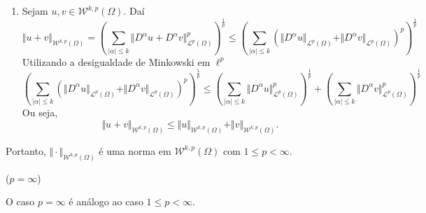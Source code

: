 \documentclass[a4paper, 11pt]{book}
\theoremstyle{definition}
\newcommand{\cL}{\mathcal{L}}
\newcommand{\cW}{\mathcal{W}}
\begin{document}
\begin{prf}
\begin{enumerate}[leftmargin=*]
        \item Sejam $u, v \in \cW^{k,p}(\Omega)$. Daí
        \[
            \Vert u + v \Vert_{\cW^{k,p}(\Omega)} = \left(\sum_{|\alpha| \leqslant k} \Vert D^\alpha u + D^\alpha v \Vert_{\cL^p(\Omega)}^p\right)^{\!\!\frac{1}{p}} \leqslant \left(\sum_{|\alpha| \leqslant k} \left(\Vert D^\alpha u \Vert_{\cL^p(\Omega)} + \Vert D^\alpha v \Vert_{\cL^p(\Omega)}\right)^p \right)^{\!\!\frac{1}{p}}
        \]
        Utilizando a desigualdade de Minkowski em $\ell^p$
        \[
            \left(\sum_{|\alpha| \leqslant k} \left(\Vert D^\alpha u \Vert_{\cL^p(\Omega)} + \Vert D^\alpha v \Vert_{\cL^p(\Omega)}\right)^p \right)^{\!\!\frac{1}{p}} \leqslant \left( \sum_{|\alpha| \leqslant k} \Vert D^\alpha u \Vert_{\cL^p(\Omega)}^p \right)^{\!\!\frac{1}{p}} + \left( \sum_{|\alpha| \leqslant k} \Vert D^\alpha v \Vert_{\cL^p(\Omega)}^p \right)^{\!\!\frac{1}{p}}
        \]
        Ou seja,
        \[
            \Vert u + v \Vert_{\cW^{k,p}(\Omega)} \leqslant \Vert u \Vert_{\cW^{k,p}(\Omega)} + \Vert v \Vert_{\cW^{k,p}(\Omega)}.
        \]
    \end{enumerate}
    Portanto, $\Vert \cdot \Vert_{\cW^{k,p}(\Omega)}$ é uma norma em $\cW^{k,p}(\Omega)$ com $1 \leqslant p < \infty$.

    ($p = \infty$)

    \noindent O caso $p = \infty$ é análogo ao caso $1 \leqslant p < \infty$.
\end{prf}
\end{document}
